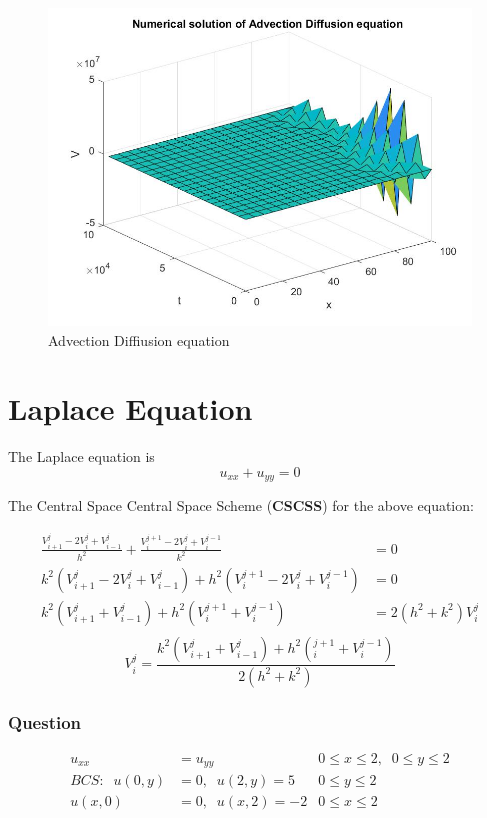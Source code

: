 \begin{figure}
  \includegraphics[scale=0.4]{advection.jpg}
  \caption{Advection Diffiusion equation}
\end{figure}
\chapter{Laplace Equation}

The Laplace equation is
\[ u_{xx}+u_{yy}=0 \]

The Central Space Central Space Scheme (\textbf{CSCSS}) for the above equation:

\begin{align*}
  \frac{V_{i+1}^j-2V_i^j+V_{i-1}^j}{h^2} + \frac{V_i^{j+1}-2V_i^j+V_i^{j-1}}{k^2} &= 0\\
  k^2(V_{i+1}^j-2V_i^j+V_{i-1}^j) + h^2(V_i^{j+1}-2V_i^j+V_i^{j-1}) &= 0\\
  k^2(V_{i+1}^j+V_{i-1}^j) + h^2(V_i^{j+1}+V_i^{j-1}) &= 2(h^2+k^2)V_i^j\\
\end{align*}
\begin{equation}
  V_i^j = \frac{k^2(V_{i+1}^j+V_{i-1}^j)+h^2(_i^{j+1}+V_i^{j-1})}{2(h^2+k^2)}
\end{equation}

\subsection{Question}
\begin{align*}
    u_{xx}&=u_{yy}           &   0\leq x \leq 2,\;\; 0 \leq y \leq 2\\
    BCS:\;\; u(0,y)&=0, \;\; u(2,y)=5   &   0\leq y \leq 2\\
             u(x,0)&=0, \;\; u(x,2)=-2  &   0\leq x \leq 2
\end{align*}
\clearpage

